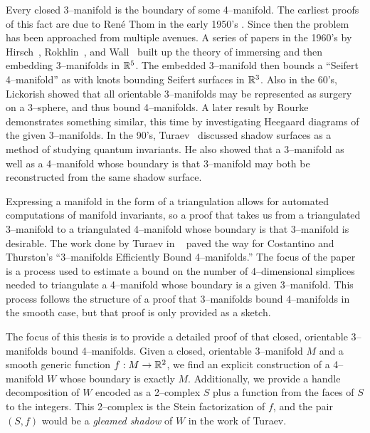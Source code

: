 Every closed 3--manifold is the boundary of some 4--manifold.
The earliest proofs of this fact are due to Ren\'e Thom in the early 1950's \cite{Thom}.
Since then the problem has been approached from multiple avenues.
A series of papers in the 1960's by Hirsch~\cite{Hirsch61}, Rokhlin~\cite{Rokhlin65}, and Wall~\cite{Wall65} built up the theory of immersing and then embedding 3--manifolds in $\mathbb{R}^5$.
The embedded 3--manifold then bounds a ``Seifert 4--manifold'' as with knots bounding Seifert surfaces in $\mathbb{R}^3$.
Also in the 60's, Lickorish showed that all orientable 3--manifolds may be represented as surgery on a 3--sphere, and thus bound 4--manifolds.
A later result by Rourke~\cite{Rourke85} demonstrates something similar, this time by investigating Heegaard diagrams of the given 3--manifolds.
In the 90's, Turaev~\cite{Turaev91} discussed shadow surfaces as a method of studying quantum invariants.
He also showed that a 3--manifold as well as a 4--manifold whose boundary is that 3--manifold may both be reconstructed from the same shadow surface.

Expressing a manifold in the form of a triangulation allows for automated computations of manifold invariants, so a proof that takes us from a triangulated 3--manifold to a triangulated 4--manifold whose boundary is that 3--manifold is desirable.
The work done by Turaev in ~\cite{Turaev91} paved the way for Costantino and Thurston's ``3--manifolds Efficiently Bound 4--manifolds.''
The focus of the paper is a process used to estimate a bound on the number of 4--dimensional simplices needed to triangulate a 4--manifold whose boundary is a given 3--manifold.
This process follows the structure of a proof that 3--manifolds bound 4--manifolds in the smooth case, but that proof is only provided as a sketch.

The focus of this thesis is to provide a detailed proof of that closed, orientable 3--manifolds bound 4--manifolds.
Given a closed, orientable 3--manifold $M$ and a smooth generic function $f:M\to\mathbb{R}^2$, we find an explicit construction of a 4--manifold $W$ whose boundary is exactly $M$.
Additionally, we provide a handle decomposition of $W$ encoded as a 2--complex $S$ plus a function from the faces of $S$ to the integers.
This 2--complex is the Stein factorization of $f$, and the pair $(S,f)$ would be a \emph{gleamed shadow} of $W$ in the work of Turaev.

